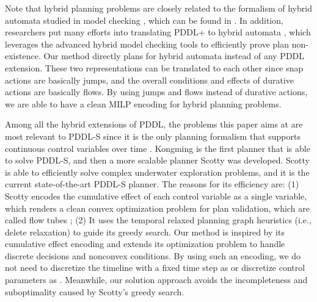 \documentclass[sigconf]{acmart}
\begin{document}
Note that hybrid planning problems are closely related to the formalism of hybrid automata studied in model checking \cite{henzinger1998s,lynch1995hybrid}, which can be found in \cite{fox2006modelling}. In addition, researchers put many efforts into translating PDDL+ to hybrid automata \cite{bogomolov2014planning,bogomolov2015pddl+}, which leverages the advanced hybrid model checking tools \cite{cimatti2000nusmv,frehse2011spaceex,frehse2008phaver} to efficiently prove plan non-existence. Our method directly plans for hybrid automata instead of any PDDL extension. These two representations can be translated to each other since snap actions are basically jumps, and the overall conditions and effects of durative actions are basically flows. By using jumps and flows instead of durative actions, we are able to have a clean MILP encoding for hybrid planning problems.


Among all the hybrid extensions of PDDL, the problems this paper aims at are most relevant to PDDL-S since it is the only planning formalism that supports continuous control variables over time \cite{fernandez2018scottyactivity}.  Kongming \cite{li2008generative} is the first planner that is able to solve PDDL-S, and then a more scalable planner Scotty \cite{fernandez2018scottyactivity} was developed. Scotty is able to efficiently solve complex underwater exploration problems, and it is the current state-of-the-art PDDL-S planner. The reasons for its efficiency are: (1) Scotty encodes the cumulative effect of each control variable as a single variable, which renders a clean convex optimization problem for plan validation, which are called flow tubes \cite{hofmann2006robust}; (2) It uses the temporal relaxed planning graph heuristics (i.e., delete relaxation) \cite{coles2012colin} to guide its greedy search.  Our method is inspired by its cumulative effect encoding and extends its optimization problem to handle discrete decisions and nonconvex conditions. By using such an encoding, we do not need to discretize the timeline with a fixed time step as \cite{li2008generative} or discretize control parameters as \cite{coles2012colin}. Meanwhile, our solution approach avoids the incompleteness and suboptimality caused by Scotty's greedy search.
\end{document}
